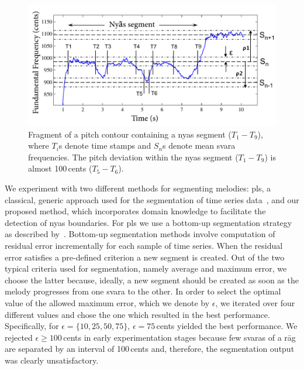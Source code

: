 {\begin{figure}
	\begin{center}
		\includegraphics[width=\figSizeNinety]{ch05_preprocessing/figures/NyasSegmentationMethod.pdf}
	\end{center}
	\caption{Fragment of a pitch contour containing a \gls{nyas} segment ($T_1-T_9$), where $T_i$s denote time stamps and $S_n$s denote mean \gls{svara} frequencies. The pitch deviation within the \gls{nyas} segment ($T_1-T_9$) is almost 100\,cents ($T_5-T_6$).}
	\label{fig:nyas_segmentation_illustration}
\end{figure}

We experiment with two different methods for segmenting melodies: \gls{pls}, a classical, generic approach used for the segmentation of time series data~\citep{keogh2004segmenting}, and our proposed method, which incorporates domain knowledge to facilitate the detection of \gls{nyas} boundaries. For \gls{pls} we use a bottom-up segmentation strategy as described by~\cite{keogh2004segmenting}. Bottom-up segmentation methods involve computation of residual error incrementally for each sample of time series. When the residual error satisfies a pre-defined criterion a new segment is created. Out of the two typical criteria used for segmentation, namely average and maximum error, we choose the latter because, ideally, a new segment should be created as soon as the melody progresses from one \gls{svara} to the other. In order to select the optimal value of the allowed maximum error, which we denote by $\epsilon$, we iterated over four different values and chose the one which resulted in the best performance. Specifically, for $\epsilon=\lbrace 10, 25, 50, 75\rbrace$, $\epsilon=75$\,cents yielded the best performance. We rejected $\epsilon\geq 100$\,cents in early experimentation stages because few \glspl{svara} of a r\={a}g are separated by an interval of 100\,cents and, therefore, the segmentation output was clearly unsatisfactory.

}
